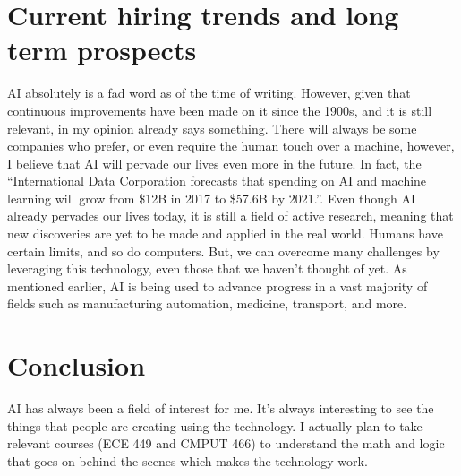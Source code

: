 \documentclass[letterpaper,12pt]{article}
\begin{document}
\section{Current hiring trends and long term prospects}

AI absolutely is a fad word as of the time of writing. However, given that continuous improvements
have been made on it since the 1900s, and it is still relevant, in my opinion already says something.
There will always be some companies who prefer, or even require the human touch
over a machine, however, I believe that AI will pervade our lives even more in the future.
In fact, the 
``International Data Corporation forecasts that spending on AI and machine learning will grow from \$12B in 2017 to \$57.6B by 2021.''.
\cite{forbesprojected}
Even though AI already pervades our lives today, 
it is still a field of active research\cite{uofaAI}, meaning that new
discoveries are yet to be made and applied in the real world.
Humans have certain limits, and so do computers. But, we can overcome many challenges by leveraging this technology,
even those that we haven't thought of yet. 
As mentioned earlier,
AI is being used to advance progress in a vast majority of fields
such as manufacturing automation, medicine, transport, and more.

\section{Conclusion}

AI has always been a field of interest for me.
It's always interesting to see the things that people are creating
using the technology. I actually plan to take relevant courses (ECE 449 and CMPUT 466)
to understand the math and logic that goes on behind the scenes
which makes the technology work.


\singlespacing
\nocite{*}
\printbibliography
% 
% 
\end{document}

